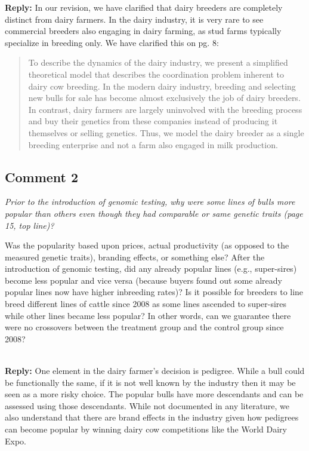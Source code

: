 \documentclass[12pt,letterpaper]{article}
\begin{document}
\textbf{Reply:} In our revision, we have clarified that dairy breeders are completely distinct from dairy farmers. In the dairy industry, it is very rare to see commercial breeders also engaging in dairy farming, as stud farms typically specialize in breeding only. We have clarified this on pg. 8:

\begin{quote}
To describe the dynamics of the dairy industry, we present a simplified theoretical model that describes the coordination problem inherent to dairy cow breeding.
In the modern dairy industry, breeding and selecting new bulls for sale has become almost exclusively the job of dairy breeders.
In contrast, dairy farmers are largely uninvolved with the breeding process and buy their genetics from these companies instead of producing it themselves or selling genetics.
Thus, we model the dairy breeder as a single breeding enterprise and not a farm also engaged in milk production.
\end{quote}

\subsection*{Comment 2}
{\it Prior to the introduction of genomic testing, why were some lines of bulls more popular than others even though they had comparable or same genetic traits (page 15, top line)?

Was the popularity based upon prices, actual productivity (as opposed to the measured genetic traits), branding effects, or something else? After the introduction of genomic testing, did any already popular lines (e.g., super-sires) become less popular and vice versa (because buyers found out some already popular lines now have higher inbreeding rates)? Is it possible for breeders to line breed different lines of cattle since 2008 as some lines ascended to super-sires while other lines became less popular? In other words, can we guarantee there were no crossovers between the treatment group and the control group since 2008?} \\

\textbf{Reply:} One element in the dairy farmer's decision is pedigree. While a bull could be functionally the same, if it is not well known by the industry then it may be seen as a more risky choice. The popular bulls have more descendants and can be assessed using those descendants. While not documented in any literature, we also understand that there are brand effects in the industry given how pedigrees can become popular by winning dairy cow competitions like the World Dairy Expo.
\end{document}
